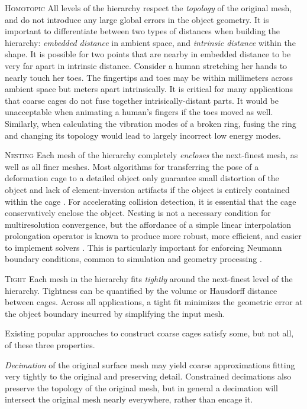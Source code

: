 \noindent \textsc{Homotopic} All levels of the hierarchy respect the
\emph{topology} of the original mesh, and do not introduce any large global
errors in the object geometry. It is important to differentiate between two
types of distances when building the hierarchy: \emph{embedded distance} in
ambient space, and \emph{intrinsic distance} within the shape.
%
It is possible for two points that are nearby in embedded distance to be very
far apart in intrinsic distance. Consider a human stretching her hands to
nearly touch her toes. The fingertips and toes may be within millimeters across
ambient space but meters apart intrinsically.
%
It is critical for many applications that coarse cages do not fuse together
intrisically-distant parts. It would be unacceptable when animating a 
human's fingers if the toes moved as well.
%
Similarly, when calculating the vibration modes of a broken ring, fusing the
ring and changing its topology would lead to largely incorrect low energy
modes.

\noindent \textsc{Nesting}
%
Each mesh of the hierarchy completely \emph{encloses} the next-finest mesh, as
well as all finer meshes.
%
Most algorithms for transferring the pose of a deformation cage to a detailed
object only guarantee small distortion of the object and lack of
element-inversion artifacts if the object is entirely contained within the cage
\cite{HarmonicCoodinates07,Ben-Chen:2009:VHM}.
%
For accelerating collision detection, it is essential that the cage
conservatively enclose the object.
%
Nesting is not a necessary condition for multiresolution convergence, but the
affordance of a simple linear interpolation prolongation operator is known to
produce more robust, more efficient, and easier to implement solvers
\cite{chan2000robust,dickopf2010multilevel}.
%
This is particularly important for enforcing Neumann boundary conditions,
common to simulation and geometry processing \cite{chan1999boundary}.

\noindent \textsc{Tight}
%
Each mesh in the hierarchy fits \emph{tightly} around the next-finest level of
the hierarchy.
%
Tightness can be quantified by the volume or Hausdorff distance between cages.
%
Across all applications, a tight fit minimizes the geometric error at the
object boundary incurred by simplifying the input mesh.

Existing popular approaches to construct coarse cages satisfy some, but not
all, of these three properties.

\emph{Decimation} of the original surface mesh may yield coarse
approximations fitting very tightly to the original and preserving detail.
%
Constrained decimations also preserve the topology of the original mesh, but in
general a decimation will intersect the original mesh nearly everywhere, rather
than encage it.


